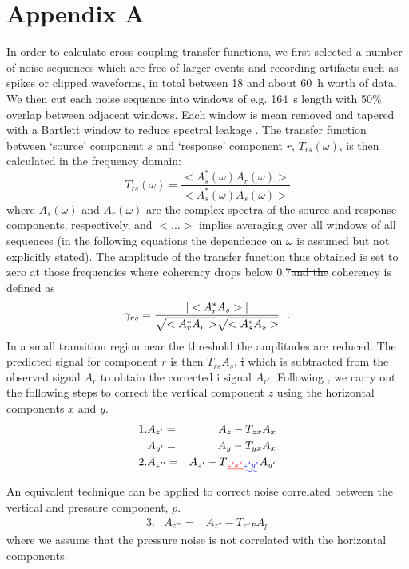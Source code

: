 \documentclass{article}
\providecommand{\DIFadd}[1]{{\protect\color{blue}\uwave{#1}}} %
\providecommand{\DIFdel}[1]{{\protect\color{red}\sout{#1}}}                      %
\providecommand{\DIFaddbegin}{} %
\providecommand{\DIFaddend}{} %
\providecommand{\DIFdelbegin}{} %
\providecommand{\DIFdelend}{} %
\begin{document}
{\section*{Appendix A}
In order to calculate cross-coupling transfer functions, 
we first selected a number of noise sequences which are free of
larger events and recording artifacts such as spikes or clipped
waveforms, in total between 18 and about 60~h worth of data. We then cut each
noise sequence into windows of e.g. 164~s length with 50\% overlap between
adjacent windows.  Each window is mean removed and 
tapered with a Bartlett window to reduce spectral leakage \citep{press:92}.
The transfer function between `source' component $s$ and `response'
component $r$, $T_{rs}(\omega)$, is then calculated in the frequency domain:
\begin{displaymath}
T_{rs}(\omega)=\frac{<A_s^*(\omega)A_r(\omega)>}{<A_s^*(\omega)A_s(\omega)>}
\end{displaymath}
where $A_s(\omega)$ and $A_r(\omega)$ are the complex spectra of the
source and response components, respectively, and $<\ldots>$
implies averaging over all windows of all sequences (in the following
equations the dependence on $\omega$ is assumed but not explicitly stated).
The amplitude of the transfer function thus obtained is set to zero at
those frequencies where coherency drops below 0.7\DIFdelbegin \DIFdel{and the }\DIFdelend \DIFaddbegin \DIFadd{. The }\DIFaddend coherency is defined as
\begin{displaymath}
\gamma_{rs}=\frac{|<A_r^*A_s>|}{\sqrt{<A_r^*A_r>}\sqrt{<A_s^*A_s>}}\ \ 
{\bf .}
\end{displaymath}
In a small transition region near the threshold the amplitudes are reduced.  
The predicted signal for component $r$ is then $T_{rs} A_s$, 
\DIFdelbegin \DIFdel{i
}\DIFdelend which is subtracted from the observed signal $A_r$ to obtain the corrected 
\DIFdelbegin \DIFdel{i
}\DIFdelend signal $A_{r'}$.  
Following \citet{crawford:00}, we carry out the following steps to correct 
the vertical component $z$ using the horizontal components $x$ and $y$.
\begin{eqnarray*}
1. & A_{z'}= & A_z-T_{zx}A_x \\
   & A_{y'}= & A_y-T_{yx}A_x \\
2. & A_{z''}= & A_{z'}-T\DIFdelbegin \DIFdel{_{z'x'}}\DIFdelend \DIFaddbegin \DIFadd{_{z'y'}}\DIFaddend A_{y'}
\end{eqnarray*}
An equivalent technique can be applied to correct noise correlated
between the vertical and pressure component, $p$.
\begin{eqnarray*}
3. & A_{z'''}= & A_{z''}-T_{z''P}A_p
\end{eqnarray*}
where we assume that the pressure noise is not correlated with the
horizontal components. 

}
\end{document}
